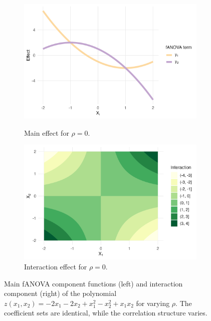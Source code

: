 \begin{figure}[htpb]
    \begin{subfigure}[t]{\textwidth}
        \centering
        \begin{minipage}[t]{0.49\textwidth}
            \includegraphics[width=\textwidth]{images/experiment_section/full_a1m20_a2m20_a11p10_a22m10_a12p10_rhop00_main.png}
            \caption{Main effect for $\rho = 0$.}
        \end{minipage}%
        \hfill
        \begin{minipage}[t]{0.49\textwidth}
            \includegraphics[width=\textwidth]{images/experiment_section/full_a1m20_a2m20_a11p10_a22m10_a12p10_rhop00_interaction.png}
            \caption{Interaction effect for $\rho = 0$.}
        \end{minipage}
    \end{subfigure}
    \caption{Main fANOVA component functions (left) and interaction component (right) of the polynomial $z(x_1, x_2) = -2x_1 - 2 x_2 + x_1^2 - x_2^2 + x_1x_2$ for varying $\rho$. The coefficient sets are identical, while the correlation structure varies.}
    \label{fig:all_pair_02}
\end{figure}

